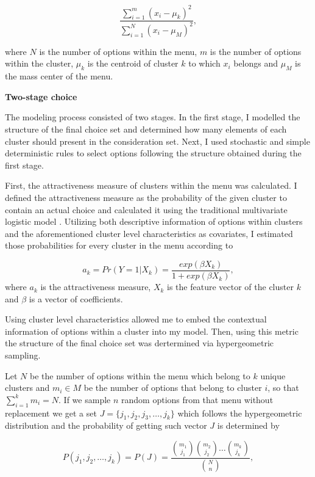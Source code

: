 \documentclass[a4paper,12pt]{article}
\begin{document}
$$\frac{\sum_{i=1}^{m}{({x_i -\mu_k})}^2}{{\sum_{i=1}^{N}{(x_i- \mu_M)}^2}} ,$$

where $N$ is the number of options within the menu, $m$ is the number of options within the cluster, $\mu_k$ is the centroid of cluster $k$ to which $x_i$ belongs and $\mu_M$ is the mass center of the menu.


\textbf{Two-stage choice}\label{hypergeometricDefinitionText}
 
The modeling process consisted of two stages. In the first stage, I modelled the structure of the final choice set and determined how many elements of each cluster should present in the consideration set. Next, I used stochastic and simple deterministic rules to select options following the structure obtained during the first stage.

First, the attractiveness measure of clusters within the menu was calculated. I defined the attractiveness measure as the probability of the given cluster to contain an actual choice and calculated it using the traditional multivariate logistic model \citep{ben1985discrete}. Utilizing both descriptive information of options within clusters and the aforementioned cluster level characteristics as covariates, I estimated those probabilities for every cluster in the menu according to

\begin{equation}\label{eq:multivariateLogit}
    a_k = Pr(Y=1|X_k)=\frac{exp(\beta  X_k)}{1 + exp(\beta X_k)},
\end{equation}
where $a_k$ is the attractiveness measure, $X_k$ is the feature vector of the cluster $k$ and $\beta$ is a vector of coefficients.
 
Using cluster level characteristics allowed me to embed the contextual information of options within a cluster into my model. Then, using this metric the structure of the final choice set was dertermined via hypergeometric sampling. 

Let $N$ be the number of options within the menu which belong to $k$ unique clusters and $m_i\in M$ be the number  of options that belong to cluster $i$, so that $\sum_{i=1}^{k}m_i= N$. If we sample $n$ random options from that menu without replacement we get a set $J = \{j_1,j_2,j_3, \dots,j_k\}$ which follows the hypergeometric distribution and the probability of getting such vector $J$ is determined by

\begin{equation}\label{eq:hypergeometric1}
    P(j_1, j_2,\ldots, j_k) = P(J) =\frac{{m_1\choose j_1} {m_2\choose j_2} \dots {m_k\choose j_k}}{{N\choose n}} ,
\end{equation}
\end{document}
